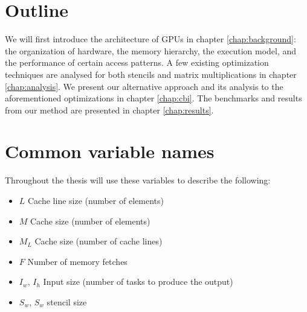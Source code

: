 \section{Outline}
We will first introduce the architecture of GPUs in chapter \ref{chap:background}: the organization of hardware, the memory hierarchy, the execution model, and the performance of certain access patterns.
A few existing optimization techniques are analysed for both stencils and matrix multiplications in chapter \ref{chap:analysis}.
We present our alternative approach and its analysis to the aforementioned optimizations in chapter \ref{chap:cbi}.
The benchmarks and results from our method are presented in chapter \ref{chap:results}.

\section{Common variable names}
Throughout the thesis will use these variables to describe the following:
\begin{itemize}
    \item $L$ Cache line size (number of elements)
    \item $M$ Cache size (number of elements)
    \item $M_L$ Cache size (number of cache lines)
    \item $F$ Number of memory fetches
    \item $I_w$, $I_h$ Input size (number of tasks to produce the output)
    \item $S_w$, $S_w$ stencil size
\end{itemize}